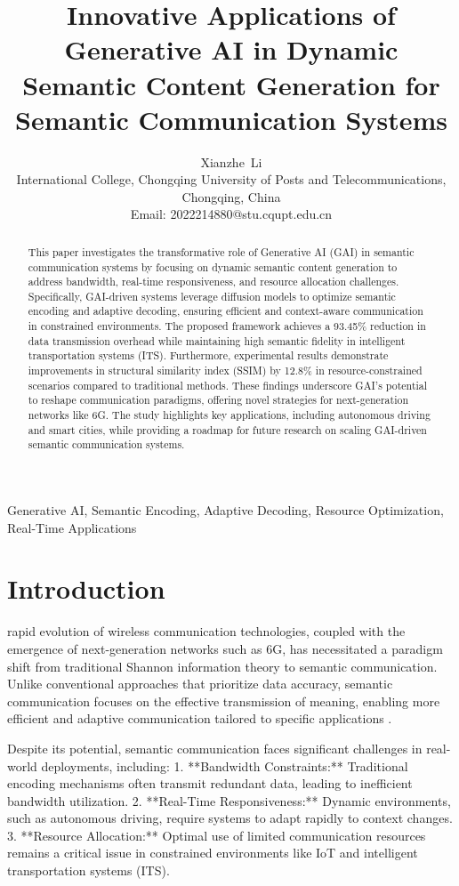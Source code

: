\documentclass[journal]{IEEEtran}
\title{Innovative Applications of Generative AI in Dynamic Semantic Content Generation for Semantic Communication Systems}
\author{
    Xianzhe~Li\\
    International College, Chongqing University of Posts and Telecommunications, Chongqing, China\\
    Email: 2022214880@stu.cqupt.edu.cn
}
\begin{document}
\maketitle

\begin{abstract}
This paper investigates the transformative role of Generative AI (GAI) in semantic communication systems by focusing on dynamic semantic content generation to address bandwidth, real-time responsiveness, and resource allocation challenges. Specifically, GAI-driven systems leverage diffusion models to optimize semantic encoding and adaptive decoding, ensuring efficient and context-aware communication in constrained environments. The proposed framework achieves a 93.45\% reduction in data transmission overhead while maintaining high semantic fidelity in intelligent transportation systems (ITS). Furthermore, experimental results demonstrate improvements in structural similarity index (SSIM) by 12.8\% in resource-constrained scenarios compared to traditional methods. These findings underscore GAI’s potential to reshape communication paradigms, offering novel strategies for next-generation networks like 6G. The study highlights key applications, including autonomous driving and smart cities, while providing a roadmap for future research on scaling GAI-driven semantic communication systems.
\end{abstract}



\begin{IEEEkeywords}
Generative AI, Semantic Encoding, Adaptive Decoding, Resource Optimization, Real-Time Applications
\end{IEEEkeywords}

\IEEEpeerreviewmaketitle

\section{Introduction}
 rapid evolution of wireless communication technologies, coupled with the emergence of next-generation networks such as 6G, has necessitated a paradigm shift from traditional Shannon information theory to semantic communication. Unlike conventional approaches that prioritize data accuracy, semantic communication focuses on the effective transmission of meaning, enabling more efficient and adaptive communication tailored to specific applications \cite{9530497}.

Despite its potential, semantic communication faces significant challenges in real-world deployments, including:
1. **Bandwidth Constraints:** Traditional encoding mechanisms often transmit redundant data, leading to inefficient bandwidth utilization.
2. **Real-Time Responsiveness:** Dynamic environments, such as autonomous driving, require systems to adapt rapidly to context changes.
3. **Resource Allocation:** Optimal use of limited communication resources remains a critical issue in constrained environments like IoT and intelligent transportation systems (ITS).
\end{document}
